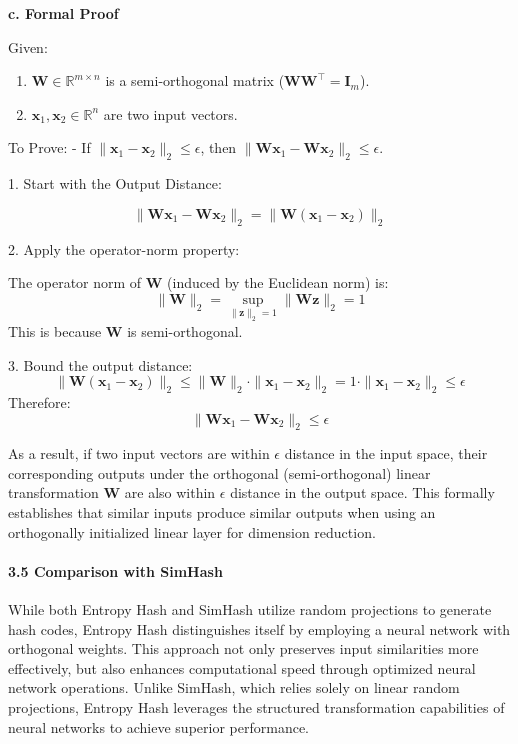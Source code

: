 \documentclass{article}
\begin{document}
\textbf{c. Formal Proof}

Given:

\begin{enumerate}
    \item  \( \mathbf{W} \in \mathbb{R}^{m \times n} \) is a semi-orthogonal matrix (\( \mathbf{W} \mathbf{W}^\top = \mathbf{I}_m \)).
    \item  \( \mathbf{x}_1, \mathbf{x}_2 \in \mathbb{R}^n \) are two input vectors.
\end{enumerate}

To Prove:
- If \( \|\mathbf{x}_1 - \mathbf{x}_2\|_2 \leq \epsilon \), then \( \|\mathbf{W} \mathbf{x}_1 - \mathbf{W} \mathbf{x}_2\|_2 \leq \epsilon \).


1. Start with the Output Distance:

   \[
   \|\mathbf{W} \mathbf{x}_1 - \mathbf{W} \mathbf{x}_2\|_2 = \|\mathbf{W} (\mathbf{x}_1 - \mathbf{x}_2)\|_2
   \]

2. Apply the operator-norm property:

   The operator norm of \( \mathbf{W} \) (induced by the Euclidean norm) is:
   \[
   \|\mathbf{W}\|_2 = \sup_{\|\mathbf{z}\|_2 = 1} \|\mathbf{W} \mathbf{z}\|_2 = 1
   \]
This is because \( \mathbf{W} \) is semi-orthogonal.

3. Bound the output distance: \[
   \|\mathbf{W} (\mathbf{x}_1 - \mathbf{x}_2)\|_2 \leq \|\mathbf{W}\|_2 \cdot \|\mathbf{x}_1 - \mathbf{x}_2\|_2 = 1 \cdot \|\mathbf{x}_1 - \mathbf{x}_2\|_2 \leq \epsilon
   \]
Therefore:
\[
   \|\mathbf{W} \mathbf{x}_1 - \mathbf{W} \mathbf{x}_2\|_2 \leq \epsilon
   \]

As a result, if two input vectors are within \( \epsilon \) distance in the input space, their corresponding outputs under the orthogonal (semi-orthogonal) linear transformation \( \mathbf{W} \) are also within \( \epsilon \) distance in the output space. This formally establishes that similar inputs produce similar outputs when using an orthogonally initialized linear layer for dimension reduction.


\paragraph{\textbf{3.5 Comparison with SimHash}}

While both Entropy Hash and SimHash utilize random projections to generate hash codes, Entropy Hash distinguishes itself by employing a neural network with orthogonal weights. This approach not only preserves input similarities more effectively, but also enhances computational speed through optimized neural network operations. Unlike SimHash, which relies solely on linear random projections, Entropy Hash leverages the structured transformation capabilities of neural networks to achieve superior performance.
\end{document}
